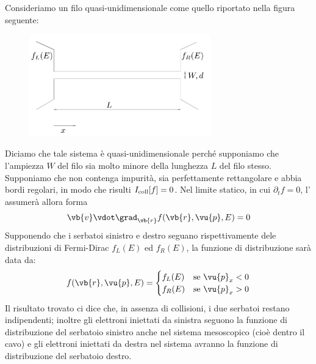 \begin{example}
    Consideriamo un filo quasi-unidimensionale come quello riportato nella figura seguente:
    \begin{figure}[H]
        \centering
        \includegraphics[width=0.7\textwidth]{Immagini/Ballistic_wire.png}
    \end{figure}
    Diciamo che tale sistema è quasi-unidimensionale perché supponiamo che l'ampiezza $W$ del filo sia molto minore della lunghezza $L$ del filo stesso.\\
    Supponiamo che non contenga impurità, sia perfettamente rettangolare e abbia bordi regolari, in modo che risulti $I_{\rm coll}[f]=0$. Nel limite statico, in cui $\partial_t f=0$, l' assumerà allora forma
    \begin{equation*}
        \vb{v} \vdot \grad_{\vb{r}} f(\vb{r},\vu{p},E)
        =0
    \end{equation*}
    Supponendo che i serbatoi sinistro e destro seguano rispettivamente dele distribuzioni di Fermi-Dirac $f_L(E)$ ed $f_R(E)$, la funzione di distribuzione sarà data da:
    \begin{equation*}
        f(\vb{r},\vu{p},E)
        =
        \begin{cases}
            f_L(E) & \text{se } \vu{p}_x<0 \\
            f_R(E) & \text{se } \vu{p}_x>0
        \end{cases}
    \end{equation*}
    Il risultato trovato ci dice che, in assenza di collisioni, i due serbatoi restano indipendenti; inoltre gli elettroni iniettati da sinistra seguono la funzione di distribuzione del serbatoio sinistro anche nel sistema mesoscopico (cioè dentro il cavo) e gli elettroni iniettati da destra nel sistema avranno la funzione di distribuzione del serbatoio destro.
\end{example}
